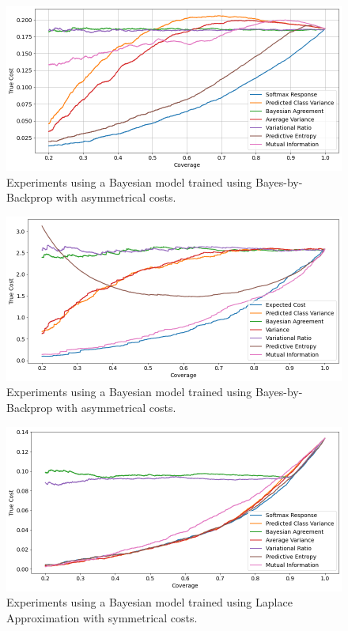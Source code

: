 \begin{figure}[h]
	\includegraphics[width=\textwidth]{images/multi-class/bbb-sym.png}
	\caption*{Experiments using a Bayesian model trained using Bayes-by-Backprop with asymmetrical costs.}
\end{figure}

\begin{figure}[h]
	\includegraphics[width=\textwidth]{images/multi-class/bbb-asym.png}
	\caption*{Experiments using a Bayesian model trained using Bayes-by-Backprop with asymmetrical costs.}
\end{figure}


\begin{figure}[h]
	\includegraphics[width=\textwidth]{images/multi-class/laplace-sym.png}
	\caption*{Experiments using a Bayesian model trained using Laplace Approximation with symmetrical costs.}
\end{figure}

